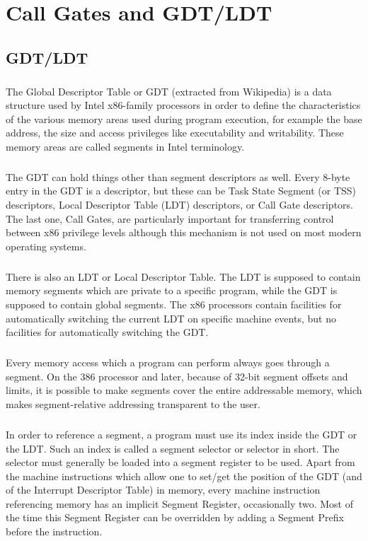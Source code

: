 \documentclass[12pt,a4paper,english]{book}
\newcommand{\keyword}[1]{\index{#1}#1}
\newcommand{\ocite}[1]{\footfullcite{#1}}
\newcommand{\paraph}{\paragraph{}}
\begin{document}
\titlespacing*{\chapter}{0pt}{-40pt}{15pt}
\fancyhead[LE,RO]{}
\setcounter{tocdepth}{3}
\tableofcontents
\fancyhead[LE,RO]{\slshape \rightmark}

\chapter{Call Gates and GDT/LDT}

\section{GDT/LDT}
\paraph{}
The Global Descriptor Table or \keyword{GDT} (extracted from Wikipedia\ocite{wikglb2010}) is a data structure used by Intel x86-family processors in order to define the characteristics of the various memory areas used during program execution, for example the base address, the size and access privileges like executability and writability. These memory areas are called segments in Intel terminology. \ocite{Int6432sofdvman3A}

\paraph{}
The GDT can hold things other than segment descriptors as well. Every 8-byte entry in the GDT is a descriptor, but these can be Task State Segment (or TSS) descriptors, Local Descriptor Table (LDT) descriptors, or Call Gate descriptors. The last one, Call Gates, are particularly important for transferring control between x86 privilege levels although this mechanism is not used on most modern operating systems.

\paraph{}
There is also an LDT or Local Descriptor Table. The LDT is supposed to contain memory segments which are private to a specific program, while the GDT is supposed to contain global segments. The x86 processors contain facilities for automatically switching the current LDT on specific machine events, but no facilities for automatically switching the GDT.

\paraph{}
Every memory access which a program can perform always goes through a segment. On the 386 processor and later, because of 32-bit segment offsets and limits, it is possible to make segments cover the entire addressable memory, which makes segment-relative addressing transparent to the user.

\paraph{}
In order to reference a segment, a program must use its index inside the GDT or the LDT. Such an index is called a segment selector or selector in short. The selector must generally be loaded into a segment register to be used. Apart from the machine instructions which allow one to set/get the position of the GDT (and of the Interrupt Descriptor Table) in memory, every machine instruction referencing memory has an implicit Segment Register, occasionally two. Most of the time this Segment Register can be overridden by adding a Segment Prefix before the instruction.
\end{document}
